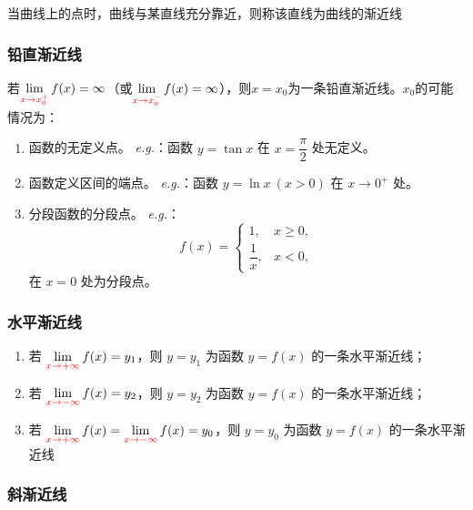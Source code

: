\documentclass[../book.tex]{subfiles}
\begin{document}
    当曲线上的点{\color{red}{远离原点}}时，曲线与某直线充分靠近，则称该直线为曲线的渐近线

    \subsubsection{铅直渐近线}

    若$\lim\limits_{{\color{red}{x\to x_0^{+}}}} f(x) = \infty$（或$\lim\limits_{{\color{red}{x\to x_0^{-}}}} f(x) = \infty$），则$x=x_0$为一条铅直渐近线。$x_0$的可能情况为：
    \begin{enumerate}
        \item 函数的无定义点。
        \emph{e.g.}：函数 $y=\tan x$ 在 $x=\dfrac{\pi}{2}$ 处无定义。

        \item 函数定义区间的端点。
        \emph{e.g.}：函数 $y=\ln x\ (x>0)$ 在 $x\to 0^+$ 处。

        \item 分段函数的分段点。
        \emph{e.g.}：
        \[
            f(x)=
            \begin{cases}
                1, & x \ge 0,\\[4pt]
                \dfrac{1}{x}, & x < 0,
            \end{cases}
        \]
        在 $x=0$ 处为分段点。
    \end{enumerate}

    \subsubsection{水平渐近线}

    \begin{enumerate}
        \item 若 $\lim\limits_{\color{red}{x\to +\infty}} f(x)=y_1$，则 $y=y_1$ 为函数 $y=f(x)$ 的一条水平渐近线；
        \item 若 $\lim\limits_{\color{red}{x\to -\infty}} f(x)=y_2$，则 $y=y_2$ 为函数 $y=f(x)$ 的一条水平渐近线；
        \item 若 $\lim\limits_{\color{red}{x\to +\infty}} f(x) = \lim\limits_{{\color{red}{x\to -\infty}}} f(x) = y_0$，则 $y=y_0$ 为函数 $y=f(x)$ 的一条水平渐近线
    \end{enumerate}

    \subsubsection{斜渐近线}
\end{document}
